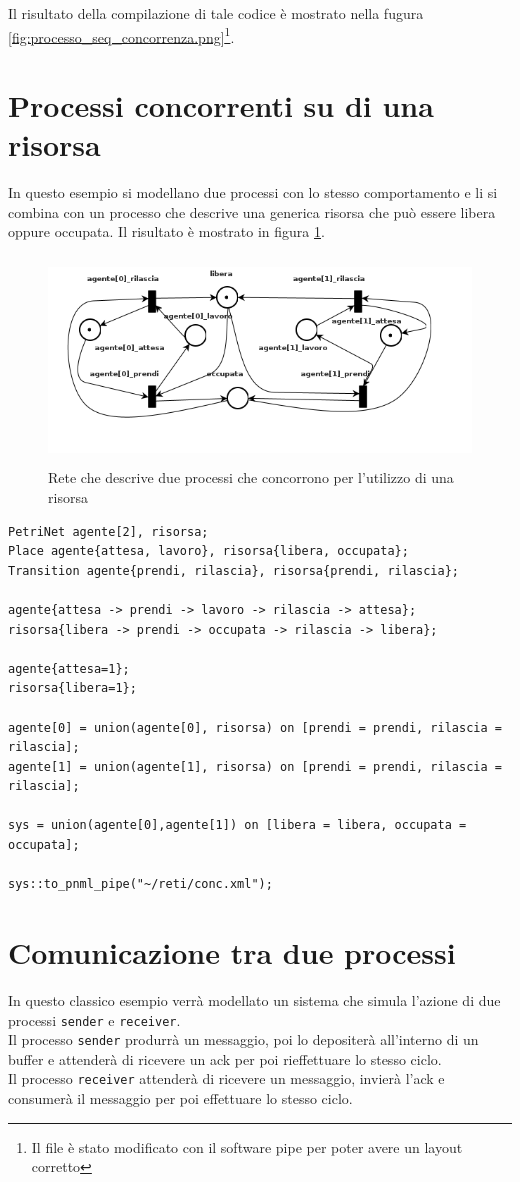 \documentclass[italian,12pt]{book}
\begin{document}
Il risultato della compilazione di tale codice è mostrato nella fugura \ref{fig:processo_seq_concorrenza.png}\footnote{Il file è stato modificato con il software pipe per poter avere un layout corretto}.

\section{Processi concorrenti su di una risorsa}
In questo esempio si modellano due processi con lo stesso comportamento e li si combina con un processo che descrive una generica risorsa che può essere libera oppure occupata. Il risultato è mostrato in figura \ref{fig:processi_concorrenti_su_risorsa.png}.
\begin{figure}[htb]
\centerline{\includegraphics[height=5.5cm]{img/processi_concorrenti_su_risorsa.png}}
\caption{Rete che descrive due processi che concorrono per l'utilizzo di una risorsa}\label{fig:processi_concorrenti_su_risorsa.png}
\end{figure}

\begin{verbatim}PetriNet agente[2], risorsa;
Place agente{attesa, lavoro}, risorsa{libera, occupata};
Transition agente{prendi, rilascia}, risorsa{prendi, rilascia};

agente{attesa -> prendi -> lavoro -> rilascia -> attesa};
risorsa{libera -> prendi -> occupata -> rilascia -> libera};

agente{attesa=1};
risorsa{libera=1};

agente[0] = union(agente[0], risorsa) on [prendi = prendi, rilascia = rilascia];
agente[1] = union(agente[1], risorsa) on [prendi = prendi, rilascia = rilascia];

sys = union(agente[0],agente[1]) on [libera = libera, occupata = occupata];

sys::to_pnml_pipe("~/reti/conc.xml");
\end{verbatim}

\section{Comunicazione tra due processi}
In questo classico esempio verrà modellato un sistema che simula l'azione di due processi {\tt sender} e {\tt receiver}.\\
Il processo {\tt sender} produrrà un messaggio, poi lo depositerà all'interno di un buffer e attenderà di ricevere un ack per poi rieffettuare lo stesso ciclo.\\
Il processo {\tt receiver} attenderà di ricevere un messaggio, invierà l'ack e consumerà il messaggio per poi effettuare lo stesso ciclo.\\
\end{document}
